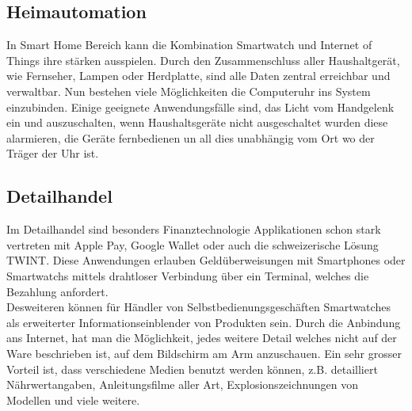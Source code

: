 \subsection{Heimautomation}
In Smart Home Bereich kann die Kombination Smartwatch und Internet of Things ihre stärken ausspielen. Durch den Zusammenschluss aller Haushaltgerät, wie Fernseher, Lampen oder Herdplatte, sind alle Daten zentral erreichbar und verwaltbar. Nun bestehen viele Möglichkeiten die Computeruhr ins System einzubinden. Einige geeignete Anwendungsfälle sind, das Licht vom Handgelenk ein und auszuschalten, wenn Haushaltsgeräte nicht ausgeschaltet wurden diese alarmieren, die Geräte fernbedienen un all dies unabhängig vom Ort wo der Träger der Uhr ist.

\subsection{Detailhandel}
Im Detailhandel sind besonders Finanztechnologie Applikationen schon stark vertreten mit Apple Pay, Google Wallet oder auch die schweizerische Lösung TWINT. Diese Anwendungen erlauben Geldüberweisungen mit Smartphones oder Smartwatchs mittels drahtloser Verbindung über ein Terminal, welches die Bezahlung anfordert.\\
Desweiteren können für Händler von Selbstbedienungsgeschäften Smartwatches als erweiterter Informationseinblender von Produkten sein. Durch die Anbindung ans Internet, hat man die Möglichkeit, jedes weitere Detail welches nicht auf der Ware beschrieben ist, auf dem Bildschirm am Arm anzuschauen. Ein sehr grosser Vorteil ist, dass verschiedene Medien benutzt werden können, z.B. detailliert Nährwertangaben, Anleitungsfilme aller Art, Explosionszeichnungen von Modellen und viele weitere.

